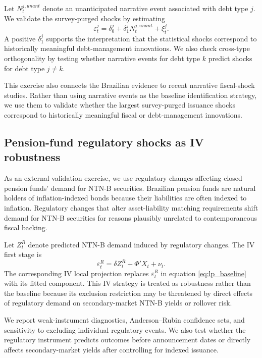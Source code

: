 \documentclass[12pt,a4paper]{article}
\begin{document}
Let \(N_t^{j,unant}\) denote an unanticipated narrative event associated with debt type \(j\). We validate the survey-purged shocks by estimating
\begin{equation}
\varepsilon_t^j
=
\delta_0^j
+
\delta_1^j N_t^{j,unant}
+
\xi_t^j.
\end{equation}
A positive \(\delta_1^j\) supports the interpretation that the statistical shocks correspond to historically meaningful debt-management innovations. We also check cross-type orthogonality by testing whether narrative events for debt type \(k\) predict shocks for debt type \(j\neq k\).

This exercise also connects the Brazilian evidence to recent narrative fiscal-shock studies. Rather than using narrative events as the baseline identification strategy, we use them to validate whether the largest survey-purged issuance shocks correspond to historically meaningful fiscal or debt-management innovations.

\subsection{Pension-fund regulatory shocks as IV robustness}

As an external validation exercise, we use regulatory changes affecting closed pension funds' demand for NTN-B securities. Brazilian pension funds are natural holders of inflation-indexed bonds because their liabilities are often indexed to inflation. Regulatory changes that alter asset-liability matching requirements shift demand for NTN-B securities for reasons plausibly unrelated to contemporaneous fiscal backing.

Let \(Z_t^R\) denote predicted NTN-B demand induced by regulatory changes. The IV first stage is
\begin{equation}
\varepsilon_t^R
=
\delta Z_t^R
+
\Phi'X_t
+
\nu_t.
\end{equation}
The corresponding IV local projection replaces \(\varepsilon_t^R\) in equation \eqref{eq:lp_baseline} with its fitted component. This IV strategy is treated as robustness rather than the baseline because its exclusion restriction may be threatened by direct effects of regulatory demand on secondary-market NTN-B yields or rollover risk.

We report weak-instrument diagnostics, Anderson--Rubin confidence sets, and sensitivity to excluding individual regulatory events. We also test whether the regulatory instrument predicts outcomes before announcement dates or directly affects secondary-market yields after controlling for indexed issuance.
\end{document}
